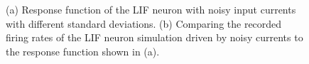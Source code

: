 \documentclass[runningheads,a4paper]{llncs}
\begin{document}
	\begin{figure}[bt!]
		\centering
		\caption{
			(a) Response function of the LIF neuron with noisy input currents with different standard deviations.
			(b) Comparing the recorded firing rates of the LIF neuron simulation driven by noisy currents to the response function shown in (a). }
		\label{fig:firefunc}	
	\end{figure}
\end{document}
